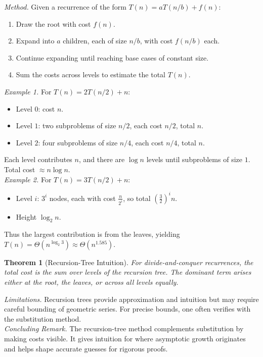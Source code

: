 \documentclass[12pt]{article}
\newcommand{\microhead}[1]{\vspace{0.45em}\noindent\textit{#1}}
\newtheorem{theorem}{Theorem}
\theoremstyle{definition}
\begin{document}
\microhead{Method.}  
Given a recurrence of the form $T(n) = aT(n/b) + f(n)$:
\begin{enumerate}
\item Draw the root with cost $f(n)$.
\item Expand into $a$ children, each of size $n/b$, with cost $f(n/b)$ each.
\item Continue expanding until reaching base cases of constant size.
\item Sum the costs across levels to estimate the total $T(n)$.
\end{enumerate} 

\microhead{Example 1.} For $T(n) = 2T(n/2) + n$:
\begin{itemize}
\item Level $0$: cost $n$.
\item Level $1$: two subproblems of size $n/2$, each cost $n/2$, total $n$.
\item Level $2$: four subproblems of size $n/4$, each cost $n/4$, total $n$.
\end{itemize}
Each level contributes $n$, and there are $\log n$ levels until subproblems of size $1$.  
Total cost $\approx n \log n$. \\

\microhead{Example 2.} For $T(n) = 3T(n/2) + n$:
\begin{itemize}
\item Level $i$: $3^i$ nodes, each with cost $\frac{n}{2^i}$, so total $\left(\tfrac{3}{2}\right)^i n$.
\item Height $\log_2 n$.
\end{itemize}
Thus the largest contribution is from the leaves, yielding $T(n) = \Theta(n^{\log_2 3}) \approx \Theta(n^{1.585})$. \\

\begin{theorem}[Recursion-Tree Intuition]
For divide-and-conquer recurrences, the total cost is the sum over levels of the recursion tree. The dominant term arises either at the root, the leaves, or across all levels equally.
\end{theorem}

\microhead{Limitations.} Recursion trees provide approximation and intuition but may require careful bounding of geometric series. For precise bounds, one often verifies with the substitution method. \\

\microhead{Concluding Remark.} The recursion-tree method complements substitution by making costs visible. It gives intuition for where asymptotic growth originates and helps shape accurate guesses for rigorous proofs. \\
\end{document}
